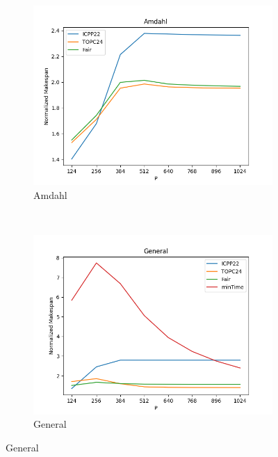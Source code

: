 \documentclass{article}
\begin{document}
\begin{figure}[htbp]
\begin{subfigure}[b]{0.32\textwidth}\includegraphics[width=\textwidth]{Results/P/P_Amdahl}\caption{Amdahl}\label{fig:lines_figures_P_Amdahl}\end{subfigure}
\\[2ex]
\begin{subfigure}[b]{0.32\textwidth}\includegraphics[width=\textwidth]{Results/P/P_General}\caption{General}\label{fig:lines_figures_P_General}\end{subfigure}
\hfill

\end{figure}
\end{document}
